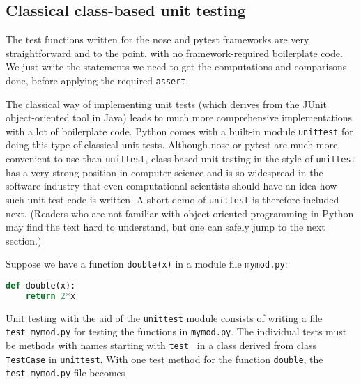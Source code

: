\documentclass[graybox,sectrefs,envcountresetchap,open=right,final]{svmonodo}
\begin{document}
\subsection{Classical class-based unit testing}
\label{softeng1:basic:unittest}


The test functions written for the nose and pytest frameworks are
very straightforward and to the point, with no framework-required boilerplate
code. We just write the statements we need to get the computations and
comparisons done, before applying the required \texttt{assert}.

The classical way of implementing unit tests (which derives from the
JUnit object-oriented tool in Java) leads to much more comprehensive
implementations with a lot of boilerplate code.  Python comes with a
built-in module \texttt{unittest} for doing this type of classical unit
tests. Although nose or pytest are much more convenient to use than
\texttt{unittest}, class-based unit testing in the style of \texttt{unittest} has a
very strong position in computer science and is so widespread in
the software industry that
even computational scientists should have an idea how such unit test
code is written. A short demo of \texttt{unittest} is therefore included
next. (Readers who are not familiar with object-oriented programming
in Python may find the text hard to understand, but one can safely
jump to the next section.)

 

Suppose we have a function \texttt{double(x)} in a module file \texttt{mymod.py}:




\begin{lstlisting}[language=python,style=blue1_bluegreen]
def double(x):
    return 2*x

\end{lstlisting}

Unit testing with the aid of the \texttt{unittest} module
consists of writing a file \Verb!test_mymod.py! for testing the functions
in \texttt{mymod.py}. The individual tests must be methods with names
starting with \Verb!test_! in a class derived from class \texttt{TestCase} in
\texttt{unittest}. With one test method for the function \texttt{double}, the
\Verb!test_mymod.py! file becomes
\end{document}
